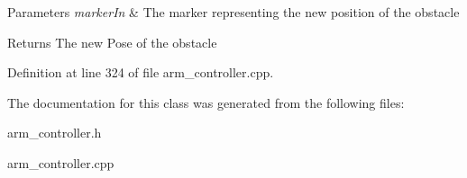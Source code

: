\begin{DoxyParams}{Parameters}
{\em marker\+In} & The marker representing the new position of the obstacle \\
\hline
\end{DoxyParams}
\begin{DoxyReturn}{Returns}
The new Pose of the obstacle 
\end{DoxyReturn}


Definition at line 324 of file arm\+\_\+controller.\+cpp.



The documentation for this class was generated from the following files\+:\begin{DoxyCompactItemize}
\item 
arm\+\_\+controller.\+h\item 
arm\+\_\+controller.\+cpp\end{DoxyCompactItemize}
